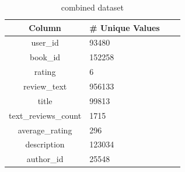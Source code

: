 \documentclass[10pt,final,journal,a4paper,oneside,twocolumn]{IEEEtran}
\begin{document}
\begin{table}[h]
    \centering
    \caption{combined dataset}
    \label{tab:all_data}
        \begin{tabular}{clll}
                \toprule
                Column & \# Unique Values \\
                \midrule
                user\_id & 93480  \\
                book\_id & 152258\\
                rating & 6\\
                review\_text & 956133\\
                title & 99813 \\
                text\_reviews\_count & 1715 \\
                average\_rating & 296 \\
                description & 123034 \\
                author\_id & 25548 \\
                \bottomrule
        \end{tabular}
    \end{table}

\end{document}
